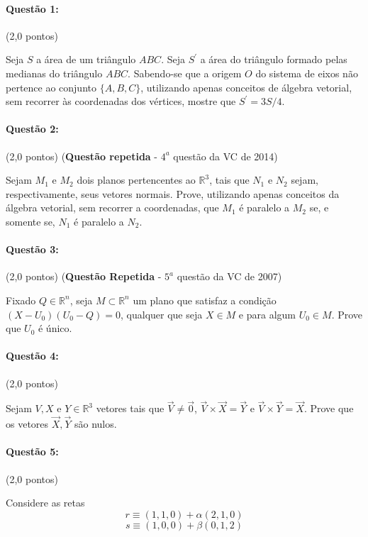 \documentclass[12pt,a4paper]{article}
\begin{document}
\paragraph{Questão 1:} (2,0 pontos) 

Seja $S$ a área de um triângulo $ABC$. Seja $S^\prime$ a área do triângulo formado pelas medianas do triângulo $ABC$. Sabendo-se que a origem $O$ do sistema de eixos não pertence ao conjunto $\{A,B,C\}$, utilizando apenas conceitos de álgebra vetorial, sem recorrer às coordenadas dos vértices, mostre que $S^\prime=3S/4$.

\paragraph{Questão 2:} (2,0 pontos) (\textbf{Questão repetida} - $4^a$ questão da VC de 2014) 

Sejam $M_1$ e $M_2$ dois planos pertencentes ao $\mathbb{R}^3$, tais que $N_1$ e $N_2$ sejam, respectivamente, seus vetores normais. Prove, utilizando apenas conceitos da álgebra vetorial, sem recorrer a coordenadas, que $M_1$ é paralelo a $M_2$ se, e somente se, $N_1$ é paralelo a $N_2$. 

\paragraph{Questão 3:} (2,0 pontos) (\textbf{Questão Repetida} - $5^a$ questão da VC de 2007)

Fixado $Q \in \mathbb{R}^n$, seja $M \subset \mathbb{R}^n$ um plano que satisfaz a condição $(X-U_0)(U_0-Q)=0$, qualquer que seja $X \in M$ e para algum $U_0 \in M$. Prove que $U_0$ é único. 

\paragraph{Questão 4:} (2,0 pontos)

Sejam $V,X$ e $Y \in\mathbb{R}^3$ vetores tais que $\overrightarrow{V} \neq \overrightarrow{0}$, $\overrightarrow{V} \times \overrightarrow{X} = \overrightarrow{Y}$ e $\overrightarrow{V} \times \overrightarrow{Y} = \overrightarrow{X}$. Prove que os vetores $\overrightarrow{X},\overrightarrow{Y}$ são nulos.

\paragraph{Questão 5:} (2,0 pontos)

Considere as retas
$$ r \equiv (1,1,0)+\alpha (2,1,0) $$
$$ s \equiv (1,0,0)+\beta  (0,1,2)$$
\end{document}
